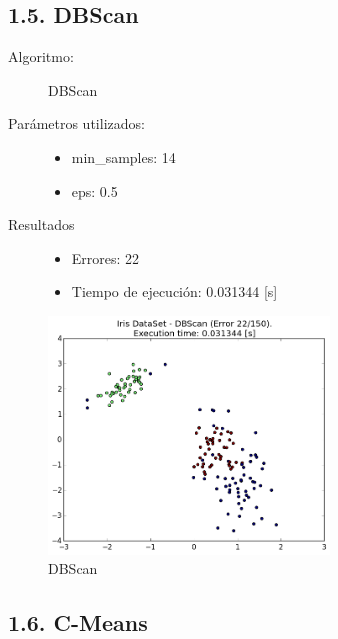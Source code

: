\documentclass{article}
\begin{document}
\newpage




\subsection*{1.5. \; DBScan}

\begin{description}
  \item[Algoritmo:] DBScan
  \item[Parámetros utilizados:] \hfill
    \begin{itemize}
      \item min\_samples: 14
      \item eps: 0.5
    \end{itemize}
  \item[Resultados]\hfill
    \begin{itemize}
      \item Errores: 22
      \item Tiempo de ejecución: 0.031344 [s]
    \end{itemize}
\end{description}

\begin{figure}[H]
  \centering
  \includegraphics[width=0.666\textwidth]{img/DBScan.png}
  \caption{DBScan}
\end{figure}

\newpage





\subsection*{1.6. \; C-Means}
\end{document}
